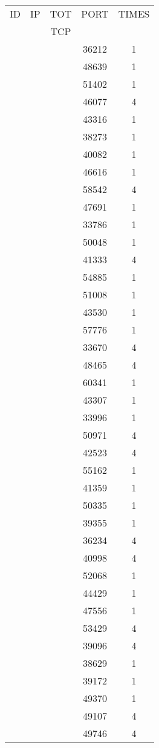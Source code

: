 \documentclass[a4paper]{scrartcl}
\begin{document}
\begin{minipage}[b]{0.5\linewidth}
\begin{tabular}{| c | c | c | c | c |}
\hline
ID & IP & TOT & PORT & TIMES \\ 
   &    & TCP &      &       \\ 
\hline
& & & 36212 & 1 \\ & & & 48639 & 1 \\ & & & 51402 & 1 \\ & & & 46077 & 4 \\ & & & 43316 & 1 \\ & & & 38273 & 1 \\ & & & 40082 & 1 \\ & & & 46616 & 1 \\ & & & 58542 & 4 \\ & & & 47691 & 1 \\ & & & 33786 & 1 \\ & & & 50048 & 1 \\ & & & 41333 & 4 \\ & & & 54885 & 1 \\ & & & 51008 & 1 \\ & & & 43530 & 1 \\ & & & 57776 & 1 \\ & & & 33670 & 4 \\ & & & 48465 & 4 \\ & & & 60341 & 1 \\ & & & 43307 & 1 \\ & & & 33996 & 1 \\ & & & 50971 & 4 \\ & & & 42523 & 4 \\ & & & 55162 & 1 \\ & & & 41359 & 1 \\ & & & 50335 & 1 \\ & & & 39355 & 1 \\ & & & 36234 & 4 \\ & & & 40998 & 4 \\ & & & 52068 & 1 \\ & & & 44429 & 1 \\ & & & 47556 & 1 \\ & & & 53429 & 4 \\ & & & 39096 & 4 \\ & & & 38629 & 1 \\ & & & 39172 & 1 \\ & & & 49370 & 1 \\ & & & 49107 & 4 \\ & & & 49746 & 4 \\ \hline\end{tabular}\end{minipage} \hfill\begin{minipage}[b]{0.5\linewidth}\begin{tabular}{| c | c | c | c | c |}

\end{tabular}
\end{minipage}
\end{document}
